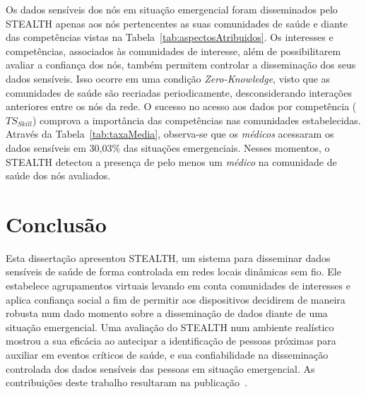\documentclass[12pt]{article}
\newcommand{\al}[1]{\textcolor{brown}{{\bf #1}}}
\begin{document}
\vspace{0.3cm}

Os dados sensíveis dos nós em situação emergencial foram disseminados pelo \mbox{STEALTH} apenas aos nós pertencentes as suas comunidades de saúde e diante das competências vistas na Tabela~\ref{tab:aspectosAtribuidos}.
Os
interesses e competências, associados
às
comunidades de interesse, além de possibilitarem avaliar a confiança dos nós, também permitem controlar a disseminação dos seus dados sensíveis. Isso ocorre em uma condição \textit{Zero-Knowledge}, visto que as comunidades de saúde são recriadas periodicamente, desconsiderando interações anteriores entre os nós da rede. O sucesso no acesso aos dados por competência ($TS_{Skill}$)
comprova a
importância
das competências nas comunidades estabelecidas. 
Através da Tabela~\ref{tab:taxaMedia}, observa-se
que os \textit{médicos} acessaram os
dados sensíveis
em 30,03\% das situações emergenciais.
Nesses
momentos,
o \mbox{STEALTH} detectou a presença de pelo menos um \textit{médico} na comunidade de saúde dos nós avaliados.

\vspace{-0.2cm}

\section{Conclusão}
\label{sec:conc}

Esta dissertação apresentou \mbox{STEALTH}, um sistema para disseminar dados sensíveis de saúde de forma controlada em redes locais dinâmicas sem fio. Ele estabelece agrupamentos virtuais levando em conta comunidades de interesses e aplica confiança social a fim de permitir aos dispositivos decidirem de maneira robusta num dado momento sobre a disseminação de dados diante de uma situação emergencial. Uma avaliação do STEALTH num ambiente realístico mostrou a sua eficácia ao antecipar a identificação de pessoas próximas para auxiliar em eventos críticos de saúde, e sua confiabilidade na disseminação controlada dos dados sensíveis das pessoas em situação emergencial. As contribuições deste trabalho resultaram na publicação~\cite{batista2019sbseg}.

\small


\end{document}
